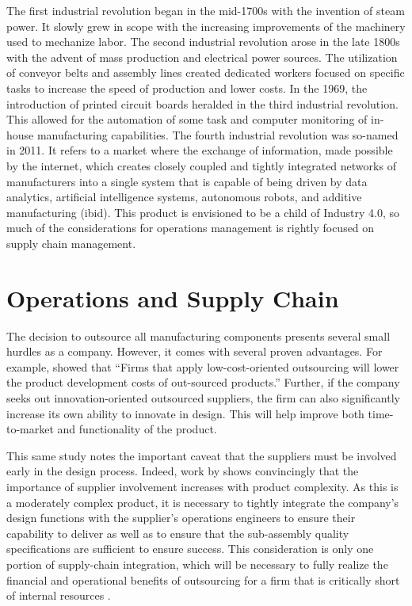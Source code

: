 \documentclass[man]{apa7}
\begin{document}
The first industrial revolution began in the mid-1700s with the invention of steam power. It slowly grew in scope with the increasing improvements of the machinery used to mechanize labor. The second industrial revolution arose in the late 1800s with the advent of mass production and electrical power sources. The utilization of conveyor belts and assembly lines created dedicated workers focused on specific tasks to increase the speed of production and lower costs. In the 1969, the introduction of printed circuit boards heralded in the third industrial revolution.  This allowed for the automation of some task and computer monitoring of in-house manufacturing capabilities. The fourth industrial revolution was so-named in 2011. It refers to a market where the exchange of information, made possible by the internet, which creates closely coupled and tightly integrated networks of manufacturers into a single system that is capable of being driven by data analytics, artificial intelligence systems, autonomous robots, and additive manufacturing (ibid).  This product is envisioned to be a child of Industry 4.0, so much of the considerations for operations management is rightly focused on supply chain management.

\section{Operations and Supply Chain}
\label{sec:orgcce89b1}

The decision to outsource all manufacturing components presents several small hurdles as a company. However, it comes with several proven advantages. For example, \textcite{bengtssonLowCostInnovationContrasting2009}  showed that ``Firms that apply low-cost-oriented outsourcing will lower the product development costs of out-sourced products.'' Further, if the company seeks out innovation-oriented outsourced suppliers, the firm can also significantly increase its own ability to innovate in design. This will help improve both time-to-market and functionality of the product.

This same study notes the important caveat that the suppliers must be involved early in the design process. Indeed, work by \parencite{fagerstromEfficientCollaborationMain2002} shows convincingly that the importance of supplier involvement increases with product complexity. As this is a moderately complex product, it is necessary to tightly integrate the company's design functions with the  supplier's operations engineers to ensure their capability to deliver as well as to ensure that the sub-assembly quality specifications are sufficient to ensure success.  This consideration is only one portion of supply-chain integration, which will be necessary to fully realize the financial and operational benefits of outsourcing for a firm that is critically short of internal resources \parencite{dekkerFirmEnablementOutsourcing2020}.
\end{document}
